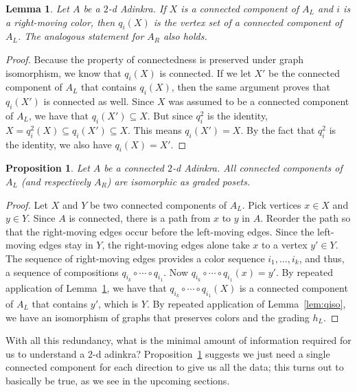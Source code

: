 \documentclass[12pt,twoside,singlespace]{article}
\numberwithin{equation}{section}
\newtheorem{lem}[equation]{Lemma}
\newtheorem{prop}[equation]{Proposition}
\theoremstyle{definition}
\begin{document}
\begin{lem}
\label{lem:qiconnected}
Let $A$ be a $2$-d Adinkra.  If $X$ is a connected component of $A_L$ and $i$ is a right-moving color, then $q_i(X)$ is the vertex set of a connected component of $A_L$. The analogous statement for $A_R$ also holds.
\end{lem}
\begin{proof}
Because the property of connectedness is preserved under graph isomorphism, we know that $q_i(X)$ is connected.  If we let $X'$ be the connected component of $A_L$ that contains $q_i(X)$, then the same argument proves that $q_i(X')$ is connected as well.  Since $X$ was assumed to be a connected component of $A_L$, we have that $q_i(X')\subseteq X$.  But since $q_i^2$ is the identity, $X=q_i^2(X)\subseteq q_i(X')\subseteq X$.  This means $q_i(X')=X$.  By the fact that $q_i^2$ is the identity, we also have $q_i(X)=X'$.
\end{proof}

\begin{prop}
\label{prop:kevin}
Let $A$ be a connected $2$-d Adinkra.  All connected components of $A_L$ (and respectively $A_R$) are isomorphic as graded posets.
\end{prop}
\begin{proof}
Let $X$ and $Y$ be two connected components of $A_L$. Pick vertices $x \in X$ and $y \in Y$. Since $A$ is connected, there is a path from $x$ to $y$ in $A$. Reorder the path so that the right-moving edges occur before the left-moving edges. Since the left-moving edges stay in $Y$, the right-moving edges alone take $x$ to a vertex $y' \in Y$.  The sequence of right-moving edges provides a color sequence $i_1,\ldots,i_k$, and thus, a sequence of compositions $q_{i_k}\circ\cdots\circ q_{i_1}$.  Now $q_{i_k}\circ\cdots\circ q_{i_1}(x)=y'$.  By repeated application of Lemma~\ref{lem:qiconnected}, we have that $q_{i_k}\circ\cdots\circ q_{i_1}(X)$ is a connected component of $A_L$ that contains $y'$, which is $Y$.  By repeated application of Lemma~\ref{lem:qiso}, we have an isomorphism of graphs that preserves colors and the grading $h_L$.
\end{proof}

With all this redundancy, what is the minimal amount of information required for us to understand a $2$-d adinkra? Proposition~\ref{prop:kevin} suggests we just need a single connected component for each direction to give us all the data; this turns out to basically be true, as we see in the upcoming sections.
\end{document}
